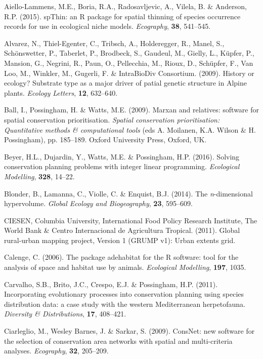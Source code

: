\documentclass[11pt,]{article}
\begin{document}


Aiello-Lammens, M.E., Boria, R.A., Radosavljevic, A., Vilela, B. \&
Anderson, R.P. (2015). spThin: an R package for spatial thinning of
species occurrence records for use in ecological niche models.
\emph{Ecography}, \textbf{38}, 541--545.

Alvarez, N., Thiel-Egenter, C., Tribsch, A., Holderegger, R., Manel, S.,
Sch{ö}nswetter, P., Taberlet, P., Brodbeck, S., Gaudeul, M., Gielly, L.,
K{ü}pfer, P., Mansion, G., Negrini, R., Paun, O., Pellecchia, M., Rioux,
D., Sch{ü}pfer, F., Van Loo, M., Winkler, M., Gugerli, F. \& IntraBioDiv
Consortium. (2009). History or ecology? Substrate type as a major driver
of patial genetic structure in Alpine plants. \emph{Ecology Letters},
\textbf{12}, 632--640.

Ball, I., Possingham, H. \& Watts, M.E. (2009). Marxan and relatives:
software for spatial conservation prioritisation. \emph{Spatial
conservation prioritisation: Quantitative methods \& computational
tools} (eds A. Moilanen, K.A. Wilson \& H. Possingham), pp. 185--189.
Oxford University Press, Oxford, UK.

Beyer, H.L., Dujardin, Y., Watts, M.E. \& Possingham, H.P. (2016).
Solving conservation planning problems with integer linear programming.
\emph{Ecological Modelling}, \textbf{328}, 14--22.

Blonder, B., Lamanna, C., Violle, C. \& Enquist, B.J. (2014). The
\emph{n}-dimensional hypervolume. \emph{Global Ecology and
Biogeography}, \textbf{23}, 595--609.

CIESEN, Columbia University, International Food Policy Research
Institute, The World Bank \& Centro Internacional de Agricultura
Tropical. (2011). Global rural-urban mapping project, Version 1 (GRUMP
v1): Urban extents grid.

Calenge, C. (2006). The package adehabitat for the R software: tool for
the analysis of space and habitat use by animals. \emph{Ecological
Modelling}, \textbf{197}, 1035.

Carvalho, S.B., Brito, J.C., Crespo, E.J. \& Possingham, H.P. (2011).
Incorporating evolutionary processes into conservation planning using
species distribution data: a case study with the western Mediterranean
herpetofauna. \emph{Diversity \& Distributions}, \textbf{17}, 408--421.

Ciarleglio, M., Wesley Barnes, J. \& Sarkar, S. (2009). ConsNet: new
software for the selection of conservation area networks with spatial
and multi-criteria analyses. \emph{Ecography}, \textbf{32}, 205--209.
\end{document}
